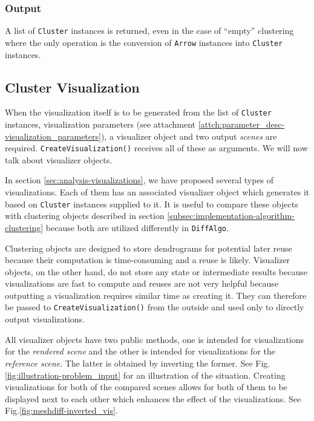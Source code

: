 \subsubsection{Output}

A list of \verb+Cluster+ instances is returned, even in the case of ``empty'' clustering where the only operation is the conversion of \verb+Arrow+ instances into \verb+Cluster+ instances.

\subsection{Cluster Visualization}
\label{subsec:implementation-algorithm-visualization}

When the visualization itself is to be generated from the list of \verb+Cluster+ instances, visualization parameters (see attachment \ref{attch:parameter_desc-visualization_parameters}), a visualizer object and two output {\it scenes} are required. \verb+CreateVisualization()+ receives all of these as arguments. We will now talk about visualizer objects.

In section \ref{sec:analysis-visualizations}, we have proposed several types of visualizations. Each of them has an associated visualizer object which generates it based on \verb+Cluster+ instances supplied to it. It is useful to compare these objects with clustering objects described in section \ref{subsec:implementation-algorithm-clustering} because both are utilized differently in \verb+DiffAlgo+.

Clustering objects are designed to store dendrograms for potential later reuse because their computation is time-consuming and a reuse is likely. Visualizer objects, on the other hand, do not store any state or intermediate results because visualizations are fast to compute and reuses are not very helpful because outputting a visualization requires similar time as creating it. They can therefore be passed to \verb+CreateVisualization()+ from the outside and used only to directly output visualizations.

All visualizer objects have two public methods, one is intended for visualizations for the {\it rendered scene} and the other is intended for visualizations for the {\it reference scene}. The latter is obtained by inverting the former. See Fig. \ref{fig:illustration-problem_input} for an illustration of the situation. Creating visualizations for both of the compared scenes allows for both of them to be displayed next to each other which enhances the effect of the visualizations. See Fig.\ref{fig:meshdiff-inverted_vis}.

